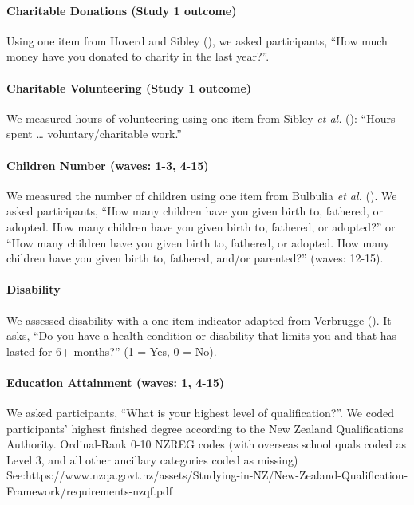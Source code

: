 \documentclass[
  single column]{article}
\let\oldparagraph\paragraph
\renewcommand{\paragraph}[1]{\oldparagraph{#1}\mbox{}}
\begin{document}
\paragraph{Charitable Donations (Study 1
outcome)}\label{charitable-donations-study-1-outcome}

Using one item from Hoverd and Sibley
(), we asked participants,
``How much money have you donated to charity in the last year?''.

\paragraph{Charitable Volunteering (Study 1
outcome)}\label{charitable-volunteering-study-1-outcome}

We measured hours of volunteering using one item from Sibley \emph{et
al.} (): ``Hours spent \ldots{}
voluntary/charitable work.''

\paragraph{Children Number (waves: 1-3,
4-15)}\label{children-number-waves-1-3-4-15}

We measured the number of children using one item from Bulbulia \emph{et
al.} (). We asked participants, ``How
many children have you given birth to, fathered, or adopted. How many
children have you given birth to, fathered, or adopted?'' or ``How many
children have you given birth to, fathered, or adopted. How many
children have you given birth to, fathered, and/or parented?'' (waves:
12-15).

\paragraph{Disability}\label{disability}

We assessed disability with a one-item indicator adapted from Verbrugge
(). It asks, ``Do you have a health
condition or disability that limits you and that has lasted for 6+
months?'' (1 = Yes, 0 = No).

\paragraph{Education Attainment (waves: 1,
4-15)}\label{education-attainment-waves-1-4-15}

We asked participants, ``What is your highest level of qualification?''.
We coded participants' highest finished degree according to the New
Zealand Qualifications Authority. Ordinal-Rank 0-10 NZREG codes (with
overseas school quals coded as Level 3, and all other ancillary
categories coded as missing)
See:https://www.nzqa.govt.nz/assets/Studying-in-NZ/New-Zealand-Qualification-Framework/requirements-nzqf.pdf
\end{document}
